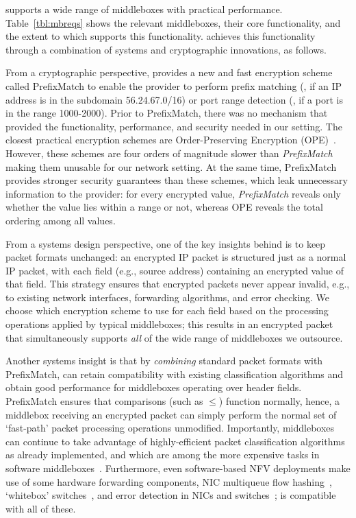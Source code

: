\sys supports a wide range of middleboxes with practical performance.  Table~\ref{tbl:mbreqs} shows the relevant middleboxes, their core functionality, and the extent to which \sys supports this functionality.
\sys achieves this functionality through a combination of systems and cryptographic innovations, as follows.
   
From a cryptographic perspective, \sys provides a new and fast encryption scheme called PrefixMatch  to enable the provider to perform prefix matching (\eg{}, if an IP address is in the subdomain 56.24.67.0/16) or port range detection (\eg{}, if a port is in the range 1000-2000). Prior to PrefixMatch, there was no mechanism that provided the functionality, performance, and  security needed in our setting. The closest practical encryption schemes are Order-Preserving Encryption (OPE)~\cite{boldyreva:ope,popa:mope,popa:cryptdb}. 
However, these schemes are four orders of magnitude slower than {\it PrefixMatch} making them unusable for our network setting. At the same time, PrefixMatch provides stronger security guarantees than these schemes, which leak unnecessary information to the provider: for every encrypted value, {\em PrefixMatch} reveals only whether the value lies within a range or not, whereas OPE reveals the total ordering among all values.

  From a systems design perspective, one of the key insights behind \sys is to keep packet formats unchanged: an encrypted IP packet is structured just as a normal IP packet, with each field (e.g., source address) containing an encrypted value of that field.
  This strategy ensures that encrypted packets never appear invalid, e.g., to existing network interfaces, forwarding algorithms, and error checking. 
  We choose which encryption scheme to use for each field based on the processing operations applied by typical middleboxes; this results in an encrypted packet that simultaneously supports {\it all} of the wide range of middleboxes we outsource.
  
  Another systems insight is that by {\it combining} standard packet formats with PrefixMatch, \sys can retain compatibility with existing classification algorithms and obtain good performance for middleboxes operating over header fields.
  PrefixMatch ensures that comparisons (such as $\leq$) function normally, hence, a middlebox receiving an encrypted packet can simply perform the normal set of `fast-path' packet processing operations unmodified.
  Importantly, middleboxes can continue to take advantage of highly-efficient packet classification algorithms~\cite{packet_classif} as already implemented, and which are among the more expensive tasks in software middleboxes~\cite{comb}.
  Furthermore, even software-based NFV deployments make use of some hardware forwarding components, \eg{} NIC multiqueue flow hashing~\cite{nicdocument}, `whitebox' switches~\cite{whitebox}, and error detection in NICs and switches~\cite{nicdocument, ciscov6}; \sys is compatible with all of these.

